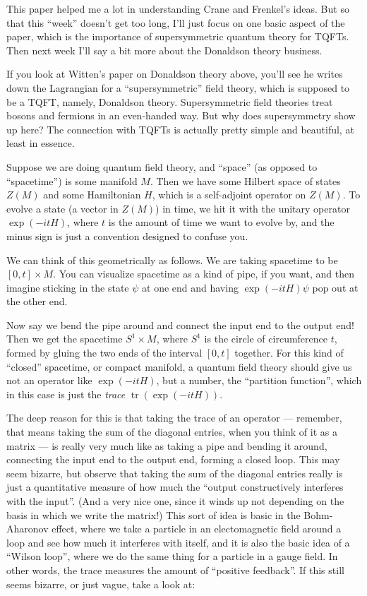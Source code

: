 \documentclass{article}
\begin{document}
This paper helped me a lot in understanding Crane and Frenkel's ideas.
But so that this ``week'' doesn't get too long, I'll just focus on one
basic aspect of the paper, which is the importance of supersymmetric
quantum theory for TQFTs. Then next week I'll say a bit more about the
Donaldson theory business.

If you look at Witten's paper on Donaldson theory above, you'll see he
writes down the Lagrangian for a ``supersymmetric'' field theory, which
is supposed to be a TQFT, namely, Donaldson theory. Supersymmetric field
theories treat bosons and fermions in an even-handed way. But why does
supersymmetry show up here? The connection with TQFTs is actually pretty
simple and beautiful, at least in essence.

Suppose we are doing quantum field theory, and ``space'' (as opposed to
``spacetime'') is some manifold \(M\). Then we have some Hilbert space
of states \(Z(M)\) and some Hamiltonian \(H\), which is a self-adjoint
operator on \(Z(M)\). To evolve a state (a vector in \(Z(M)\)) in time,
we hit it with the unitary operator \(\exp(-itH)\), where \(t\) is the
amount of time we want to evolve by, and the minus sign is just a
convention designed to confuse you.

We can think of this geometrically as follows. We are taking spacetime
to be \([0,t] \times M\). You can visualize spacetime as a kind of pipe,
if you want, and then imagine sticking in the state \(\psi\) at one end
and having \(\exp(-itH)\psi\) pop out at the other end.

Now say we bend the pipe around and connect the input end to the output
end! Then we get the spacetime \(S^1\times M\), where \(S^1\) is the
circle of circumference \(t\), formed by gluing the two ends of the
interval \([0,t]\) together. For this kind of ``closed'' spacetime, or
compact manifold, a quantum field theory should give us not an operator
like \(\exp(-itH)\), but a number, the ``partition function'', which in
this case is just the \emph{trace} \(\operatorname{tr}(\exp(-itH))\).

The deep reason for this is that taking the trace of an operator ---
remember, that means taking the sum of the diagonal entries, when you
think of it as a matrix --- is really very much like as taking a pipe
and bending it around, connecting the input end to the output end,
forming a closed loop. This may seem bizarre, but observe that taking
the sum of the diagonal entries really is just a quantitative measure of
how much the ``output constructively interferes with the input''. (And a
very nice one, since it winds up not depending on the basis in which we
write the matrix!) This sort of idea is basic in the Bohm-Aharonov
effect, where we take a particle in an electomagnetic field around a
loop and see how much it interferes with itself, and it is also the
basic idea of a ``Wilson loop'', where we do the same thing for a
particle in a gauge field. In other words, the trace measures the amount
of ``positive feedback''. If this still seems bizarre, or just vague,
take a look at:
\end{document}
